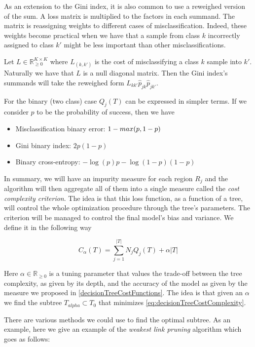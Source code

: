 As an extension to the Gini index, it is also common to use a reweighed version of the sum.
A loss matrix is multiplied to the factors in each summand.
The matrix is reassigning weights to different cases of misclassification.
Indeed, these weights become practical when we have that a sample from class $k$ incorrectly assigned to class $k'$ might be less important than other misclassifications.

Let $L \in \mathbb R_{\ge 0}^{K \times K}$ where $L_{(k,k')}$ is the cost of misclassifying a class $k$ sample into $k'$.
Naturally we have that $L$ is a null diagonal matrix.
Then the Gini index's summands will take the reweighed form $L_{kk'} \hat{p}_{jk} \hat{p}_{jk'}$.

For the binary (two class) case $Q_j(T)$ can be expressed in simpler terms. If we consider $p$ to be the probability of success, then we have

\begin{itemize}
\item Misclassification binary error: $1 - \\max(p, 1-p)$
\item Gini binary index: $ 2p(1-p) $
\item Binary cross-entropy: $ -\log(p)p - \log(1- p)(1-p) $
\end{itemize}\label{decisionTreeCostFunctions}

In summary, we will have an impurity measure for each region $R_j$ and the algorithm will then aggregate all of them into a single measure called the \textit{cost complexity criterion}. The idea is that this loss function, as a function of a tree, will control the whole optimization procedure through the tree's parameters. The criterion will be managed to control the final model's bias and variance. We define it in the following way

\begin{equation}
C_\alpha(T) = \sum_{j=1}^{|T|} N_j Q_j(T) + \alpha|T|
\end{equation}\label{eq:decisionTreeCostComplexity}


Here $\alpha \in \mathbb{R}_{\geq 0}$ is a tuning parameter that values the trade-off between the tree complexity, as given by its depth, and the accuracy of the model as given by the measure we proposed in \cref{decisionTreeCostFunctions}. The idea is that given an $\alpha$ we find the subtree $T_{alpha} \subset T_0$ that minimizes \cref{eq:decisionTreeCostComplexity}.

There are various methods we could use to find the optimal subtree. As an example, here we give an example of the \textit{weakest link pruning} algorithm which goes as follows:

